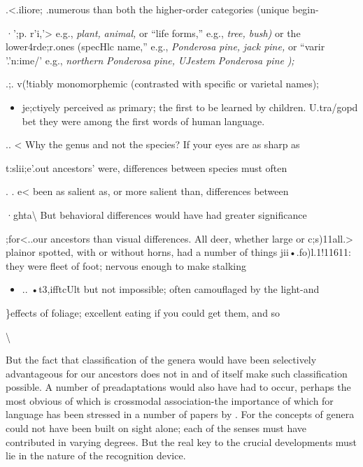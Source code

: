 .{\textless}.iliore; .numerous than both the higher-order categories ({\textquotedbl}unique begin-

·';p. r'i,'{\textgreater} e.g., \textit{plant,} \textit{animal,} or ``life forms,'' e.g., \textit{tree, bus}\textit{h}\textit{)} or the lower\-4rde;r.ones ({\textquotedbl}specHlc name,'' e.g., \textit{Ponderosa} \textit{pine,} \textit{jack pine, }or ``vari\-r '.'n:ime/' e.g., \textit{northern} \textit{Ponderosa} \textit{pine, }\textit{UJ}\textit{estem} \textit{Ponderosa pine} \textit{);}

.;. v(!tiably monomorphemic (contrasted with specific or varietal names);

\begin{itemize}
\item je;ctiyely perceived as primary; the first to be learned by children. U.tr{\textquotedbl}a/gopd bet they were among the first words of human language.
\end{itemize}

.. {\textless} Why the genus and not the species? If your eyes are as sharp as

t:slii;e'.out ancestors' were, differences between species must often

. . e{\textless} been as salient as, or more salient than, differences between

·ghta{\textbackslash} But behavioral differences would have had greater significance

;for{\textless}..our ancestors than visual differences. All deer, whether large or c;s)11all.{\textgreater} plainor spotted, with or without horns, had a number of things jii•.fo)l.1!11611: they were fleet of foot; nervous enough to make stalking

\begin{itemize}
\item .. •t3,ifftcUlt but not impossible; often camouflaged by the light-and\-
\end{itemize}

\}effects of foliage; excellent eating if you could get them, and so

{\textbackslash}


But the fact that classification of the genera would have been selectively advantageous for our ancestors does not in and of itself make such classification possible. A number of preadaptations would also have had to occur, perhaps the most obvious of which is cross\-modal association-the importance of which for language has been stressed in a number of papers by \citet{Geschwind1974}. For the concepts of genera could not have been built on sight alone; each of the senses must have contributed in varying degrees. But the real key to the crucial developments must lie in the nature of the recognition device.

